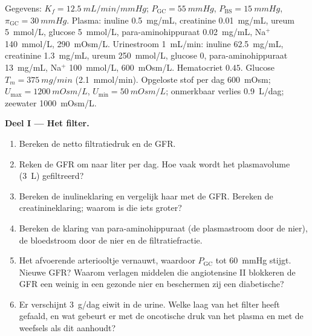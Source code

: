 \begin{problem}
\label{pb:b3:renal-osmoregulation:1}
Gegevens: $K_{f} = \qty{12.5}{mL/min/mmHg}$; $P_{\text{GC}} = \qty{55}{mmHg}$,
$P_{\text{BS}} = \qty{15}{mmHg}$, $\pi_{\text{GC}} = \qty{30}{mmHg}$.
Plasma: inuline \qty{0.5}{mg/mL}, creatinine \qty{0.01}{mg/mL}, ureum
\qty{5}{mmol/L}, glucose \qty{5}{mmol/L}, para-aminohippuraat
\qty{0.02}{mg/mL}, Na$^{+}$ \qty{140}{mmol/L}, 
\qty{290}{mOsm/L}. Urinestroom \qty{1}{mL/min}: inuline \qty{62.5}{mg/mL},
creatinine \qty{1.3}{mg/mL}, ureum \qty{250}{mmol/L}, glucose $0$,
para-aminohippuraat \qty{13}{mg/mL}, Na$^{+}$ \qty{100}{mmol/L},
 \qty{600}{mOsm/L}. Hematocriet $0.45$. Glucose $T_{m} =
\qty{375}{mg/min}$ (\qty{2.1}{mmol/min}). Opgeloste stof per dag
\qty{600}{mOsm}; $U_{\max} = \qty{1200}{mOsm/L}$, $U_{\min} = \qty{50}{mOsm/L}$;
onmerkbaar verlies \qty{0.9}{L/dag}; zeewater \qty{1000}{mOsm/L}.

\medskip
\noindent\textbf{Deel I --- Het filter.}
\begin{enumerate}
  \item Bereken de netto filtratiedruk en de GFR.
  \item Reken de GFR om naar liter per dag. Hoe vaak wordt het
        plasmavolume (\qty{3}{L}) gefiltreerd?
  \item Bereken de inulineklaring en vergelijk haar met de GFR. Bereken
        de creatinineklaring; waarom is die iets groter?
  \item Bereken de klaring van para-aminohippuraat (de plasmastroom
        door de nier), de bloedstroom door de nier en de
        filtratiefractie.
  \item Het afvoerende arteriooltje vernauwt, waardoor $P_{\text{GC}}$
        tot \qty{60}{mmHg} stijgt. Nieuwe GFR? Waarom verlagen middelen
        die angiotensine II blokkeren de GFR een weinig in een gezonde
        nier en beschermen zij een diabetische?
  \item Er verschijnt \qty{3}{g/dag} eiwit in de urine. Welke laag van
        het filter heeft gefaald, en wat gebeurt er met de oncotische
        druk van het plasma en met de weefsels als dit aanhoudt?
\end{enumerate}


\end{problem}
